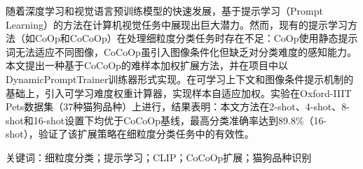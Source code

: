 随着深度学习和视觉语言预训练模型的快速发展，基于提示学习（Prompt Learning）的方法在计算机视觉任务中展现出巨大潜力。然而，现有的提示学习方法（如CoOp和CoCoOp）在处理细粒度分类任务时存在不足：CoOp使用静态提示词无法适应不同图像，CoCoOp虽引入图像条件化但缺乏对分类难度的感知能力。本文提出一种基于CoCoOp的难样本加权扩展方法，并在项目中以DynamicPromptTrainer训练器形式实现。在可学习上下文和图像条件提示机制的基础上，引入可学习难度权重计算器，实现样本自适应加权。实验在Oxford-IIIT Pets数据集（37种猫狗品种）上进行，结果表明：本文方法在2-shot、4-shot、8-shot和16-shot设置下均优于CoCoOp基线，最高分类准确率达到89.8\%（16-shot），验证了该扩展策略在细粒度分类任务中的有效性。

\vspace{\baselineskip}\noindent
\textsf{关键词：}细粒度分类；提示学习；CLIP；CoCoOp扩展；猫狗品种识别
